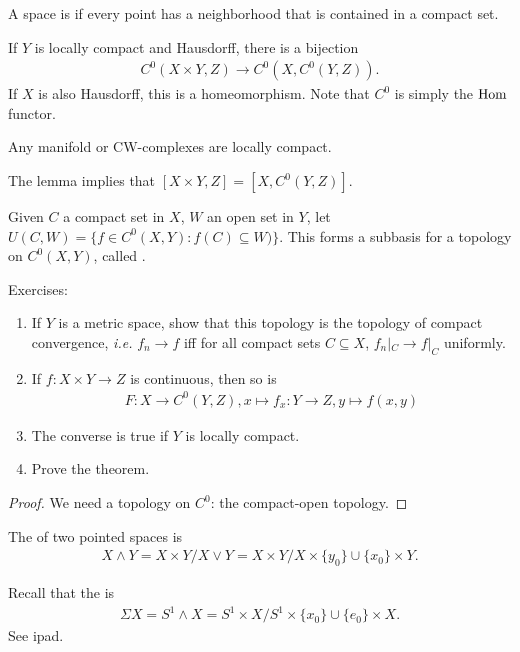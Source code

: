 \documentclass[12pt,class=article,crop=false]{standalone}
\begin{document}
\begin{defn}
A space is  if every point has a neighborhood that is contained in a compact set. 
\end{defn}
\begin{lem}
If $ Y$ is locally compact and Hausdorff, there is a bijection
 \begin{align*}
	C^{0}(X\times Y,Z) \to C^{0}(X,C^{0}(Y,Z)).
\end{align*}
If $ X$ is also Hausdorff, this is a homeomorphism. Note that $ C^{0}$ is simply the $ \operatorname{Hom}$ functor.
\begin{remark}
Any manifold or CW-complexes are locally compact.
\end{remark}
\end{lem}
\begin{remark}
	The lemma implies that $ [X\times Y,Z] = [X,C^{0}(Y,Z)]$.
\end{remark}
\begin{defn}
Given $ C$ a compact set in  $ X$,  $ W$ an open set in  $ Y$, let  $ U(C,W) = \{f \in C^{0}(X,Y) : f(C) \subseteq W)\} $. This forms a subbasis for a topology on $ C^{0}(X,Y)$, called .
\end{defn}
Exercises:
\begin{enumerate}[label=(\arabic*)]
	\item If $ Y$ is a metric space, show that this topology is the topology of compact convergence,  \emph{i.e.} $ f_n \to f$ iff for all compact sets $ C \subseteq X$, $ f_n|_C \to f|_C$ uniformly.
	\item If $ f: X \times Y \to Z$ is continuous, then so is
		\begin{align*}
			F: X \to C^{0}(Y,Z), x\mapsto f_x: Y \to Z, y \mapsto f(x,y)
		\end{align*}
	\item The converse is true if $ Y$ is locally compact.
	\item Prove the theorem.
\end{enumerate}

\begin{proof}
We need a topology on $ C^{0}$: the compact-open topology. 
\end{proof}

\begin{defn}
The  of two pointed spaces is
\begin{align*}
	X \wedge Y = X \times Y / X \vee Y = X \times Y / X \times \{y_0\} \cup \{x_0\} \times Y  .
\end{align*}
\end{defn}
Recall that the  is
\begin{align*}
	\Sigma X = S^{1} \wedge X = S^{1} \times X / S^{1} \times \{x_0\} \cup \{e_0\} \times X .
\end{align*}
See ipad.
\end{document}
